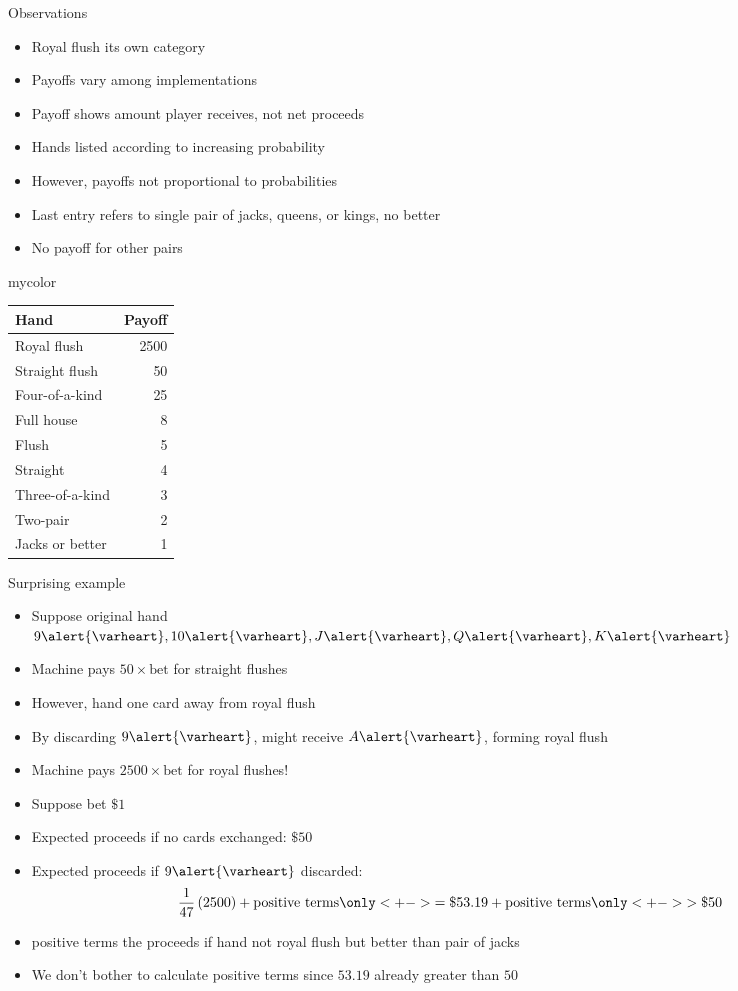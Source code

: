 \documentclass[handout,xcolor=dvipsnames]{beamer}
\theoremstyle{definition}
\newcommand{\hs}{\alert{\varheart}}
\begin{document}
\begin{frame}{Observations}
\begin{multicols}{2}
\begin{itemize}
\item Royal flush its own category
\item Payoffs vary among implementations
\item Payoff shows amount player receives, not net proceeds
\item Hands listed according to increasing probability
\item However, payoffs not proportional to probabilities
\item Last entry refers to
single pair of jacks, queens, or kings, no better
\item No payoff for other pairs
\end{itemize}
\begin{beamercolorbox}{mycolor}
\begin{tabular}{lr}
Hand&Payoff\\\hline
Royal flush&2500\\
Straight flush&50\\
Four-of-a-kind&25\\
Full house&8\\
Flush&5\\
Straight&4\\
Three-of-a-kind&3\\
Two-pair&2\\
Jacks or better&1
\end{tabular}
\end{beamercolorbox}
\end{multicols}
\end{frame}

\begin{frame}{Surprising example}
\begin{itemize}
\item Suppose original hand $9\hs,10\hs,J\hs,Q\hs,K\hs$
\item Machine pays $50\times\text{bet}$ for straight flushes
\item However, hand one card away from royal flush
\item By discarding $9\hs$, might receive $A\hs$, forming royal flush
\item Machine pays $2500\times\text{bet}$ for royal flushes!
\item Suppose bet $\$1$
\item Expected proceeds if no cards exchanged: $\$50$
\item Expected proceeds if $9\hs$ discarded:
\[\frac{1}{47}\left(2500\right)+\text{positive terms}
\only<+->{=\$53.19}+\text{positive terms}
\only<+->{>\$50}\]
\item \alert{positive terms} the proceeds if
hand not royal flush but better than pair of jacks
\item We don't bother to calculate \alert{positive terms}
since $53.19$ already greater than $50$
\end{itemize}
\end{frame}
\end{document}
